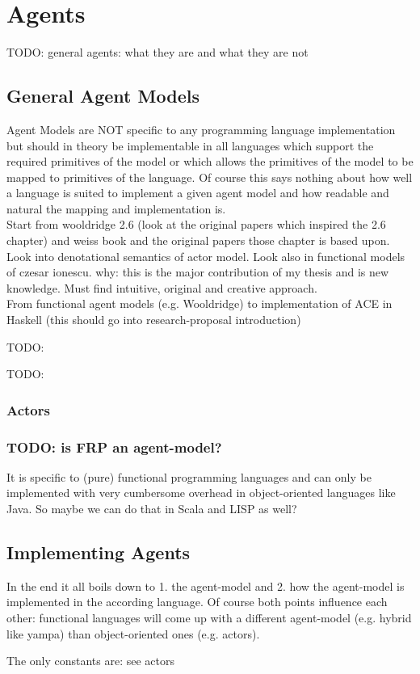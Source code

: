 \chapter{Agents}

TODO: general agents: what they are and what they are not


\section{General Agent Models}
Agent Models are NOT specific to any programming language implementation but should in theory be implementable in all languages which support the required primitives of the model or which allows the primitives of the model to be mapped to primitives of the language. Of course this says nothing about how well a language is suited to implement a given agent model and how readable and natural the mapping and implementation is. \\

Start from wooldridge 2.6 (look at the original papers which inspired the 2.6 chapter) and weiss book and the original papers those chapter is based upon. Look into denotational semantics of actor model. Look also in functional models of czesar ionescu. why: this is the major contribution of my thesis and is new knowledge. Must find intuitive, original and creative approach. \\
From functional agent models (e.g. Wooldridge) to implementation of ACE in Haskell (this should go into research-proposal introduction)

TODO: \cite{Genesereth1987}

TODO: \cite{Muller1997}

\subsection{Actors}

\subsection{TODO: is FRP an agent-model?}
It is specific to (pure) functional programming languages and can only be implemented with very cumbersome overhead in object-oriented languages like Java.
So maybe we can do that in Scala and LISP as well?

\section{Implementing Agents}
In the end it all boils down to 1. the agent-model and 2. how the agent-model is implemented in the according language. Of course both points influence each other: functional languages will come up with a different agent-model (e.g. hybrid like yampa) than object-oriented ones (e.g. actors).

The only constants are: see actors